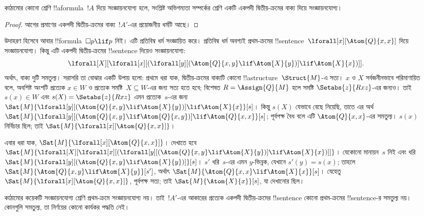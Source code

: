 \documentclass[../../../include/open-logic-section]{subfiles}
\begin{document}
\begin{cor}
  কাঠামোর কোনো শ্রেণি !!a{formula}~$!A$ দিয়ে সংজ্ঞায়নযোগ্য হলে, সংশ্লিষ্ট অভিগম্যতা সম্পর্কের শ্রেণি একটি একপদী দ্বিতীয়-ক্রমের বাক্য দিয়ে সংজ্ঞায়নযোগ্য।
\end{cor}

\begin{proof}
  আগের প্রমাণের একপদী দ্বিতীয়-ক্রমের বাক্য~$!A'$-এর প্রয়োজনীয় ধর্মটি আছে।
\end{proof}

উদাহরণ হিসেবে আবার !!{formula}~$\Box p \lif p$ নিই। এটি প্রতিবিম্ব ধর্ম সংজ্ঞায়িত করে। প্রতিবিম্ব ধর্ম অবশ্যই প্রথম-ক্রমের !!{sentence}~$\lforall[x][\Atom{Q}{x,x}]$ দিয়ে সংজ্ঞায়নযোগ্য। কিন্তু এটি একপদী দ্বিতীয়-ক্রমের !!{sentence} দিয়েও সংজ্ঞায়নযোগ্য:
\[
\lforall[X][\lforall[x][(\lforall[y][(\Atom{Q}{x,y} \lif \Atom{X}{y})]
    \lif \Atom{X}{x})]].
\]
অর্থাৎ, বাক্য দুটি সমতুল্য। সরাসরি তা বোঝার একটি উপায় হলো: প্রথমে ধরা যাক, দ্বিতীয়-ক্রমের বাক্যটি কোনো !!a{structure}~$\Struct{M}$-এ সত্য। $x$ ও $X$ সর্বজনীনভাবে পরিমাণায়িত বলে, অবশিষ্ট অংশটি প্রত্যেক $x \in W$ ও প্রত্যেক সমষ্টি~$X \subseteq W$-এর জন্য সত্য হতে হবে; বিশেষত $R =
\Assign{Q}{M}$ হলে সমষ্টি $\Setabs{z}{Rxz}$-এর জন্যও। তাই $s(x) \in W$ এবং $s(X) =
\Setabs{z}{Rxz}$ এমন প্রত্যেক~$s$-এর জন্য $\Sat{M}{\lforall[y][(\Atom{Q}{x,y} \lif
    \Atom{X}{y})] \lif \Atom{X}{x}}[s]$। কিন্তু $s(X)$ যেভাবে বেছে নিয়েছি, তাতে এর অর্থ $\Sat{M}{\lforall[y][(\Atom{Q}{x,y} \lif
    \Atom{Q}{x,y})] \lif \Atom{Q}{x,x}}[s]$; পূর্বপক্ষ বৈধ বলে এটি $\Atom{Q}{x,x}$-এর সমতুল্য। $s(x)$ নির্বিচার ছিল; তাই $\Sat{M}{\lforall[x][\Atom{Q}{x,x}]}$।

এবার ধরা যাক, $\Sat{M}{\lforall[x][\Atom{Q}{x,x}]}$। দেখাতে হবে $\Sat{M}{\lforall[X][\lforall[x][(\lforall[y][(\Atom{Q}{x,y} \lif
        \Atom{X}{y})] \lif \Atom{X}{x})]]}$। যেকোনো মানায়ন~$s$ নিই এবং ধরি $\Sat{M}{\lforall[y][(\Atom{Q}{x,y} \lif
    \Atom{X}{y})]}[s]$। $s'$ ধরি~$s$-এর এমন $y$-ভিন্নক, যেখানে $s'(y)
= s(x)$; তাহলে $\Sat{M}{\Atom{Q}{x,y} \lif \Atom{X}{y}}[s']$, অর্থাৎ $\Sat{M}{\Atom{Q}{x,x} \lif \Atom{X}{x}}[s]$। যেহেতু $\Sat{M}{\lforall[x][\Atom{Q}{x,x}]}$, পূর্বপক্ষ সত্য; তাই $\Sat{M}{\Atom{X}{x}}[s]$, যা দেখানোর ছিল।

কাঠামোর কয়েকটি সংজ্ঞায়নযোগ্য শ্রেণি প্রথম-ক্রমে সংজ্ঞায়নযোগ্য নয়। তাই~$!A'$-এর আকারের প্রত্যেক একপদী দ্বিতীয়-ক্রমের !!{sentence} কোনো প্রথম-ক্রমের !!{sentence}-র সমতুল্য নয়। কোনগুলি সমতুল্য, তা নির্ণয়ের কোনো কার্যকর পদ্ধতি নেই।
\end{document}
